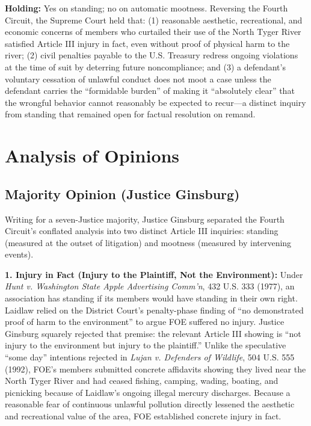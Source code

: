 \documentclass[12pt]{article}
\begin{document}
\textbf{Holding:} Yes on standing; no on automatic mootness. Reversing the Fourth Circuit, the Supreme Court held that: (1) reasonable aesthetic, recreational, and economic concerns of members who curtailed their use of the North Tyger River satisfied Article III injury in fact, even without proof of physical harm to the river; (2) civil penalties payable to the U.S. Treasury redress ongoing violations at the time of suit by deterring future noncompliance; and (3) a defendant's voluntary cessation of unlawful conduct does not moot a case unless the defendant carries the ``formidable burden'' of making it ``absolutely clear'' that the wrongful behavior cannot reasonably be expected to recur---a distinct inquiry from standing that remained open for factual resolution on remand.

\section{Analysis of Opinions}
\subsection{Majority Opinion (Justice Ginsburg)}

Writing for a seven-Justice majority, Justice Ginsburg separated the Fourth Circuit's conflated analysis into two distinct Article III inquiries: standing (measured at the outset of litigation) and mootness (measured by intervening events).

\textbf{1. Injury in Fact (Injury to the Plaintiff, Not the Environment):} Under \textit{Hunt v. Washington State Apple Advertising Comm'n}, 432 U.S. 333 (1977), an association has standing if its members would have standing in their own right. Laidlaw relied on the District Court's penalty-phase finding of ``no demonstrated proof of harm to the environment'' to argue FOE suffered no injury. Justice Ginsburg squarely rejected that premise: the relevant Article III showing is ``not injury to the environment but injury to the plaintiff.'' Unlike the speculative ``some day'' intentions rejected in \textit{Lujan v. Defenders of Wildlife}, 504 U.S. 555 (1992), FOE's members submitted concrete affidavits showing they lived near the North Tyger River and had ceased fishing, camping, wading, boating, and picnicking because of Laidlaw's ongoing illegal mercury discharges. Because a reasonable fear of continuous unlawful pollution directly lessened the aesthetic and recreational value of the area, FOE established concrete injury in fact.
\end{document}
